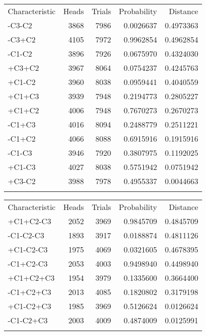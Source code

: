 \documentclass[
  ignorenonframetext,
]{beamer}
\renewcommand{\,}{\text{, }}
\begin{document}
\begin{frame}
\small

\begin{longtable}[]{@{}lrrrr@{}}
\toprule
Characteristic & Heads & Trials & Probability &
Distance \\ \addlinespace
\midrule
\endhead
-C3-C2 & 3868 & 7986 & 0.0026637 & 0.4973363 \\ \addlinespace
-C3+C2 & 4105 & 7972 & 0.9962854 & 0.4962854 \\ \addlinespace
-C1-C2 & 3896 & 7926 & 0.0675970 & 0.4324030 \\ \addlinespace
+C3+C2 & 3967 & 8064 & 0.0754237 & 0.4245763 \\ \addlinespace
+C1-C2 & 3960 & 8038 & 0.0959441 & 0.4040559 \\ \addlinespace
+C1+C3 & 3939 & 7948 & 0.2194773 & 0.2805227 \\ \addlinespace
+C1+C2 & 4006 & 7948 & 0.7670273 & 0.2670273 \\ \addlinespace
-C1+C3 & 4016 & 8094 & 0.2488779 & 0.2511221 \\ \addlinespace
-C1+C2 & 4066 & 8088 & 0.6915916 & 0.1915916 \\ \addlinespace
-C1-C3 & 3946 & 7920 & 0.3807975 & 0.1192025 \\ \addlinespace
+C1-C3 & 4027 & 8038 & 0.5751942 & 0.0751942 \\ \addlinespace
+C3-C2 & 3988 & 7978 & 0.4955337 & 0.0044663 \\ \addlinespace
\bottomrule
\end{longtable}
\end{frame}

\begin{frame}
\small

\begin{longtable}[]{@{}lrrrr@{}}
\toprule
Characteristic & Heads & Trials & Probability &
Distance \\ \addlinespace
\midrule
\endhead
+C1+C2-C3 & 2052 & 3969 & 0.9845709 & 0.4845709 \\ \addlinespace
-C1-C2-C3 & 1893 & 3917 & 0.0188874 & 0.4811126 \\ \addlinespace
+C1-C2-C3 & 1975 & 4069 & 0.0321605 & 0.4678395 \\ \addlinespace
-C1+C2-C3 & 2053 & 4003 & 0.9498940 & 0.4498940 \\ \addlinespace
+C1+C2+C3 & 1954 & 3979 & 0.1335600 & 0.3664400 \\ \addlinespace
-C1+C2+C3 & 2013 & 4085 & 0.1820802 & 0.3179198 \\ \addlinespace
+C1-C2+C3 & 1985 & 3969 & 0.5126624 & 0.0126624 \\ \addlinespace
-C1-C2+C3 & 2003 & 4009 & 0.4874009 & 0.0125991 \\ \addlinespace
\bottomrule
\end{longtable}
\end{frame}
\end{document}
